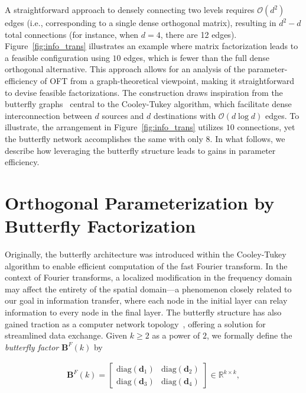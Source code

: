 A straightforward approach to densely connecting two levels requires $\mathcal{O}(d^2)$ edges (i.e., corresponding to a single dense orthogonal matrix), resulting in $d^2-d$ total connections (for instance, when $d=4$, there are 12 edges). Figure~\ref{fig:info_trans} illustrates an example where matrix factorization leads to a feasible configuration using $10$ edges, which is fewer than the full dense orthogonal alternative. This approach allows for an analysis of the parameter-efficiency of OFT from a graph-theoretical viewpoint, making it straightforward to devise feasible factorizations. The construction draws inspiration from the butterfly graphs~\cite{cooley1965algorithm} central to the Cooley-Tukey algorithm, which facilitate dense interconnection between $d$ sources and $d$ destinations with $\mathcal{O}(d\log d)$ edges. To illustrate, the arrangement in Figure~\ref{fig:info_trans} utilizes $10$ connections, yet the butterfly network accomplishes the same with only $8$. In what follows, we describe how leveraging the butterfly structure leads to gains in parameter efficiency.

\section{Orthogonal Parameterization by Butterfly Factorization}

Originally, the butterfly architecture was introduced within the Cooley-Tukey algorithm to enable efficient computation of the fast Fourier transform. In the context of Fourier transforms, a localized modification in the frequency domain may affect the entirety of the spatial domain—a phenomenon closely related to our goal in information transfer, where each node in the initial layer can relay information to every node in the final layer. The butterfly structure has also gained traction as a computer network topology~\cite{solihin2015fundamentals,li2011linear}, offering a solution for streamlined data exchange. Given $k \geq 2$ as a power of $2$, we formally define the \emph{butterfly factor} $\bm{B}^F(k)$ by

\begin{equation}\label{eq:but_factor}
\begin{aligned}
    \bm{B}^F(k)=\begin{bmatrix}
    \text{diag}(\bm{d}_1) & \text{diag}(\bm{d}_2) \\
    \text{diag}(\bm{d}_3) & \text{diag}(\bm{d}_4)
    \end{bmatrix}\in\mathbb{R}^{k\times k},
\end{aligned}
\end{equation}

